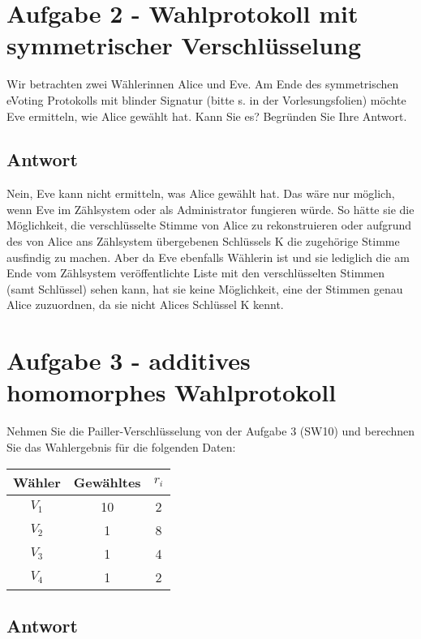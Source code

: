 \documentclass[a4paper]{article}
\begin{document}
\section*{Aufgabe 2 - Wahlprotokoll mit symmetrischer Verschlüsselung}
	
	Wir betrachten zwei Wählerinnen Alice und Eve. Am Ende des symmetrischen eVoting Protokolls mit blinder Signatur (bitte s. in der Vorlesungsfolien) möchte Eve ermitteln, wie Alice gewählt hat. Kann Sie es? Begründen Sie Ihre Antwort.
	
\subsection*{Antwort}

	Nein, Eve kann nicht ermitteln, was Alice gewählt hat. Das wäre nur möglich, wenn Eve im Zählsystem oder als Administrator fungieren würde. So hätte sie die Möglichkeit, die verschlüsselte Stimme von Alice zu rekonstruieren oder aufgrund des von Alice ans Zählsystem übergebenen Schlüssels K die zugehörige Stimme ausfindig zu machen. Aber da Eve ebenfalls Wählerin ist und sie lediglich die am Ende vom Zählsystem veröffentlichte Liste mit den verschlüsselten Stimmen (samt Schlüssel) sehen kann, hat sie keine Möglichkeit, eine der Stimmen genau Alice zuzuordnen, da sie nicht Alices Schlüssel K kennt.
	
	\newpage
	
\section*{Aufgabe 3 - additives homomorphes Wahlprotokoll}

Nehmen Sie die Pailler-Verschlüsselung von der Aufgabe 3 (SW10) und berechnen Sie das Wahlergebnis für die folgenden Daten: 

\begin{center}
	\begin{tabular}{|c|c|c|}
		\hline
		Wähler & Gewähltes & $r_{i}$ \\ \hline
		$V_{1}$&     10      &  2  \\ \hline
		$V_{2}$&        1   &  8  \\ \hline
		$V_{3}$&         1  &  4  \\ \hline
		$V_{4}$&          1 &  2  \\ \hline
	\end{tabular}
\end{center}

\subsection*{Antwort}
\end{document}
